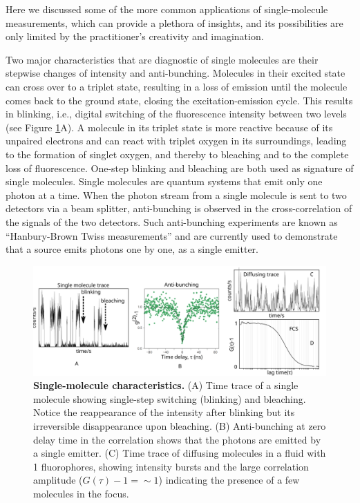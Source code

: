 Here we discussed some of the more common applications of single-molecule measurements, which can provide a plethora of insights, and its possibilities are only limited by the practitioner's creativity and imagination.

Two major characteristics that are diagnostic of single molecules are their stepwise changes of intensity and anti-bunching.\cite{rasnik2006nonblinking,basch1992photon}
Molecules in their excited state can cross over to a triplet state, resulting in a loss of emission until the molecule comes back to the ground state, closing the excitation-emission cycle.
This results in blinking, i.e., digital switching of the fluorescence intensity between two levels (see Figure \ref{fig:SM_characteristics}A).
A molecule in its triplet state is more reactive because of its unpaired electrons and can react with triplet oxygen in its surroundings, leading to the formation of singlet oxygen, and thereby to bleaching and to the complete loss of fluorescence.
One-step blinking and bleaching are both used as signature of single molecules.
Single molecules are quantum systems that emit only one photon at a time. When the photon stream from a single molecule is sent to two detectors via a beam splitter, anti-bunching is observed in the cross-correlation of the signals of the two detectors.
Such anti-bunching experiments are known as ``Hanbury-Brown Twiss  measurements'' and are currently used to demonstrate that a source emits photons one by one, as a single emitter.\cite{brown1956correlation}
\begin{figure}
	\centering
	\includegraphics[width=\textwidth]{SM_characteristics}
	\caption{\textbf{Single-molecule characteristics.}
	(A) Time trace of a single molecule showing single-step switching (blinking) and bleaching.
	Notice the reappearance of the intensity after blinking but its irreversible disappearance upon bleaching.
	(B) Anti-bunching at zero delay time in the correlation shows that the photons are emitted by a single emitter.\cite{chu2016a}
	(C) Time trace of diffusing molecules in a fluid with \SI{1}{\nM} fluorophores, showing intensity bursts and the large correlation amplitude ($G(\tau)-1={\sim}1$) indicating the presence of a few molecules in the focus.}
	\label{fig:SM_characteristics}
\end{figure}

